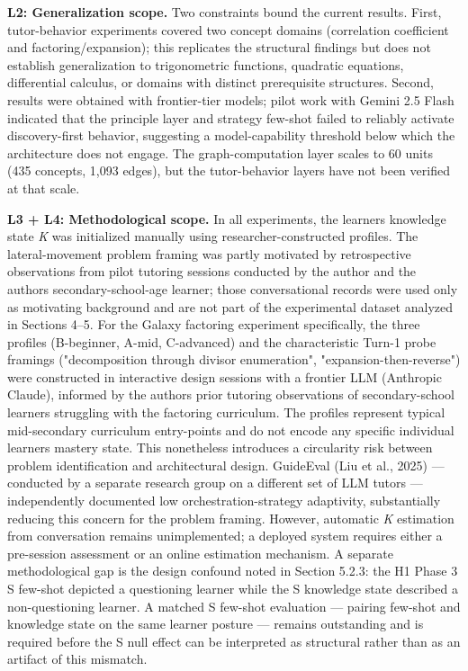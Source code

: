 \documentclass[
]{article}
\newcounter{none} %
\begin{document}
\textbf{L2: Generalization scope.} Two constraints bound the current results. First, tutor-behavior experiments covered two concept domains (correlation coefficient and factoring/expansion); this replicates the structural findings but does not establish generalization to trigonometric functions, quadratic equations, differential calculus, or domains with distinct prerequisite structures. Second, results were obtained with frontier-tier models; pilot work with Gemini 2.5 Flash indicated that the principle layer and strategy few-shot failed to reliably activate discovery-first behavior, suggesting a model-capability threshold below which the architecture does not engage. The graph-computation layer scales to 60 units (435 concepts, 1,093 edges), but the tutor-behavior layers have not been verified at that scale.

\textbf{L3 + L4: Methodological scope.} In all experiments, the learner\textquotesingle s knowledge state \emph{K} was initialized manually using researcher-constructed profiles. The lateral-movement problem framing was partly motivated by retrospective observations from pilot tutoring sessions conducted by the author and the author\textquotesingle s secondary-school-age learner; those conversational records were used only as motivating background and are not part of the experimental dataset analyzed in Sections 4--5. For the Galaxy factoring experiment specifically, the three profiles (B-beginner, A-mid, C-advanced) and the characteristic Turn-1 probe framings ("decomposition through divisor enumeration", "expansion-then-reverse") were constructed in interactive design sessions with a frontier LLM (Anthropic Claude), informed by the author\textquotesingle s prior tutoring observations of secondary-school learners struggling with the factoring curriculum. The profiles represent typical mid-secondary curriculum entry-points and do not encode any specific individual learner\textquotesingle s mastery state. This nonetheless introduces a circularity risk between problem identification and architectural design. GuideEval (Liu et al., 2025) --- conducted by a separate research group on a different set of LLM tutors --- independently documented low orchestration-strategy adaptivity, substantially reducing this concern for the problem framing. However, automatic \emph{K} estimation from conversation remains unimplemented; a deployed system requires either a pre-session assessment or an online estimation mechanism. A separate methodological gap is the design confound noted in Section 5.2.3: the H1 Phase 3 S few-shot depicted a questioning learner while the S knowledge state described a non-questioning learner. A matched S few-shot evaluation --- pairing few-shot and knowledge state on the same learner posture --- remains outstanding and is required before the S null effect can be interpreted as structural rather than as an artifact of this mismatch.
\end{document}
